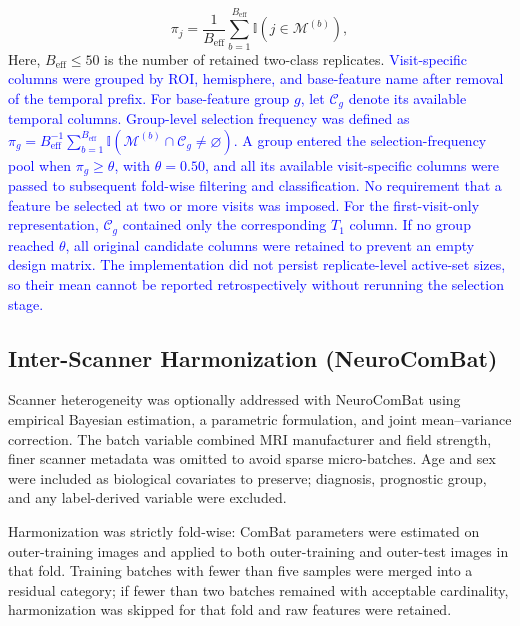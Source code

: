\documentclass[review]{elsarticle}
\newcommand{\corrigir}[2]{%
	\textcolor{red}{\sout{#1}} %
	\textcolor{blue}{#2}%
}
\begin{document}
	\begin{equation}
		\pi_j = \frac{1}{B_{\mathrm{eff}}}\sum_{b=1}^{B_{\mathrm{eff}}} \mathbb{I}(j \in \mathcal{M}^{(b)}),
		\label{eq:stability-freq}
	\end{equation}
	Here, $B_{\mathrm{eff}}\leq 50$ is the number of retained two-class replicates. \corrigir{}{Visit-specific columns were grouped by ROI, hemisphere, and base-feature name after removal of the temporal prefix. For base-feature group $g$, let $\mathcal{C}_g$ denote its available temporal columns. Group-level selection frequency was defined as $\pi_g=B_{\mathrm{eff}}^{-1}\sum_{b=1}^{B_{\mathrm{eff}}}\mathbb{I}\!\left(\mathcal{M}^{(b)}\cap\mathcal{C}_g\neq\varnothing\right)$. A group entered the selection-frequency pool when $\pi_g\geq\theta$, with $\theta=0.50$, and all its available visit-specific columns were passed to subsequent fold-wise filtering and classification. No requirement that a feature be selected at two or more visits was imposed. For the first-visit-only representation, $\mathcal{C}_g$ contained only the corresponding $T_1$ column. If no group reached $\theta$, all original candidate columns were retained to prevent an empty design matrix. The implementation did not persist replicate-level active-set sizes, so their mean cannot be reported retrospectively without rerunning the selection stage.}
	
	
	\subsection{Inter-Scanner Harmonization (NeuroComBat)}
	\label{sec:harmonization}
	
	Scanner heterogeneity was optionally addressed with NeuroComBat \cite{fortin-2018} using empirical Bayesian estimation, a parametric formulation, and joint mean--variance correction. The batch variable combined MRI manufacturer and field strength,  finer scanner metadata was omitted to avoid sparse micro-batches. Age and sex were included as biological covariates to preserve; diagnosis, prognostic group, and any label-derived variable were excluded.
	
	Harmonization was strictly fold-wise: ComBat parameters were estimated on outer-training images and applied to both outer-training and outer-test images in that fold. Training batches with fewer than five samples were merged into a residual category; if fewer than two batches remained with acceptable cardinality, harmonization was skipped for that fold and raw features were retained.
	
\end{document}
